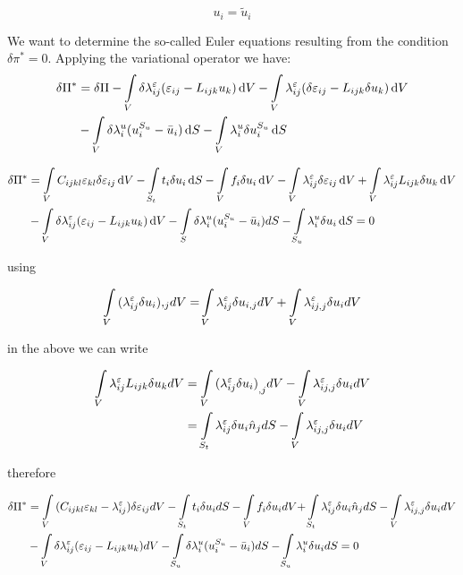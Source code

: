 \[{u_i} = {{\tilde u}_i}\]

We want to determine the so-called Euler equations resulting from the condition $\delta \pi^* = 0$. Applying the variational operator we have:
\begin{equation}
\begin{aligned}
\delta \Pi^*& = \delta \Pi  - \int\limits_V \delta \lambda_{ij}^{\varepsilon}  (\varepsilon_{ij} - L_{ijk} u_k)\dd{V}- \int\limits_V \lambda_{ij}^\varepsilon (\delta \varepsilon_{ij} - L_{ijk}\delta u_k)\dd{V} \\
&-\int\limits_V \delta \lambda_i^u (u_i^{S_u} - \bar u_i)\dd{S} - \int\limits_V \lambda _i^u \delta u_i^{S_u} \dd{S}
\end{aligned}
\end{equation}

\begin{equation}
\begin{aligned}
\delta \Pi^* &= \int\limits_V C_{ijkl} \varepsilon_{kl} \delta  \varepsilon_{ij}\dd{V} - \int\limits_{S_t} t_i \delta{u_i} \dd{S}  - \int\limits_V f_i\delta {u_i}\dd{V} - \int\limits_V \lambda_{ij}^{\varepsilon} \delta \varepsilon_{ij}\dd{V}  + \int\limits_V \lambda_{ij}^{\varepsilon} L_{ijk}\delta {u_k}\dd{V}\\
&- \int\limits_V \delta \lambda_{ij}^{\varepsilon} (\varepsilon_{ij} - L_{ijk} u_k)\dd{V} - \int\limits_S \delta \lambda_i^u (u_i^{S_u} - \bar {u}_i)dS - \int\limits_{S_u} \lambda _i^u\delta {u_i}\dd{S} = 0
\end{aligned}
\end{equation}

using

\[\int\limits_V {(\lambda _{ij}^\varepsilon \delta {u_i}){,_j}dV = } \int\limits_V {\lambda _{ij}^\varepsilon \delta {u_{i,j}}dV}  + \int\limits_V {\lambda _{ij,j}^\varepsilon \delta {u_i}dV} \]

in the above we can write

\begin{align*}
\int\limits_V {\lambda _{ij}^\varepsilon {L_{ijk}}\delta {u_k}dV} & = \int\limits_V {{{(\lambda _{ij}^\varepsilon \delta {u_i})}_{,j}}dV}  - \int\limits_V {\lambda _{ij,j}^\varepsilon \delta {u_i}dV}\\
& = \int\limits_{{S_t}} {\lambda _{ij}^\varepsilon \delta {u_i}{{\hat n}_j}dS}  - \int\limits_V {\lambda _{ij,j}^\varepsilon \delta {u_i}dV}
\end{align*}

therefore


\begin{align*}
\delta \Pi^* &= \int\limits_V {({C_{ijkl}}{\varepsilon _{kl}} - \lambda _{ij}^\varepsilon )\delta {\varepsilon _{ij}}dV - \int\limits_{{S_t}} {{t_i}\delta {u_i}dS}  - \int\limits_V {{f_i}\delta {u_i}dV + } } \int\limits_{{S_t}} {\lambda _{ij}^\varepsilon \delta {u_i}{{\hat n}_j}dS}  - \int\limits_V {\lambda _{ij,j}^\varepsilon \delta {u_i}dV}\\
&- \int\limits_V {\delta \lambda _{ij}^\varepsilon ({\varepsilon _{ij}} - {L_{ijk}}{u_k})dV}  - \int\limits_{{S_u}} {\delta \lambda _i^u(u_i^{{S_u}} - {{\bar u}_i})dS}  - \int\limits_{{S_u}} {\lambda _i^u\delta {u_i}dS}  = 0
\end{align*}



